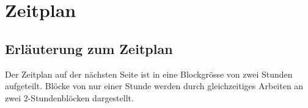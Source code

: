 \chapter{Zeitplan}


\section{Erläuterung zum Zeitplan}
Der Zeitplan auf der nächsten Seite ist in eine Blockgrösse von zwei Stunden aufgeteilt. Blöcke von nur einer Stunde werden durch gleichzeitiges Arbeiten an zwei 2-Stundenblöcken dargestellt.


\newcommand{\soll}[3]{\ganttbar{#1}{#2}{#3}}
\newcommand{\ist}[2]{\ganttbar[bar top shift=-0.01,bar/.append style={bottom color=green}]{}{#1}{#2}}

